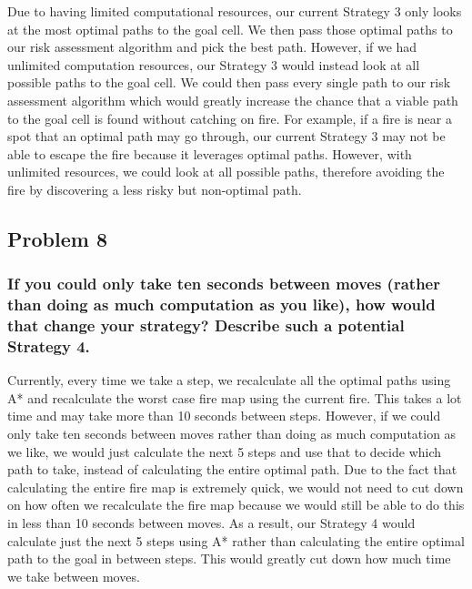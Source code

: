 \documentclass[11pt]{article}
\begin{document}
    Due to having limited computational resources, our current Strategy 3
only looks at the most optimal paths to the goal cell. We then pass
those optimal paths to our risk assessment algorithm and pick the best
path. However, if we had unlimited computation resources, our Strategy 3
would instead look at all possible paths to the goal cell. We could then
pass every single path to our risk assessment algorithm which would
greatly increase the chance that a viable path to the goal cell is found
without catching on fire. For example, if a fire is near a spot that an
optimal path may go through, our current Strategy 3 may not be able to
escape the fire because it leverages optimal paths. However, with
unlimited resources, we could look at all possible paths, therefore
avoiding the fire by discovering a less risky but non-optimal path.

    \hypertarget{problem-8}{%
\subsection{Problem 8}\label{problem-8}}

    \hypertarget{if-you-could-only-take-ten-seconds-between-moves-rather-than-doing-as-much-computation-as-you-like-how-would-that-change-your-strategy-describe-such-a-potential-strategy-4.}{%
\subsubsection{If you could only take ten seconds between moves (rather
than doing as much computation as you like), how would that change your
strategy? Describe such a potential Strategy
4.}\label{if-you-could-only-take-ten-seconds-between-moves-rather-than-doing-as-much-computation-as-you-like-how-would-that-change-your-strategy-describe-such-a-potential-strategy-4.}}

    Currently, every time we take a step, we recalculate all the optimal
paths using A* and recalculate the worst case fire map using the current
fire. This takes a lot time and may take more than 10 seconds between
steps. However, if we could only take ten seconds between moves rather
than doing as much computation as we like, we would just calculate the
next 5 steps and use that to decide which path to take, instead of
calculating the entire optimal path. Due to the fact that calculating
the entire fire map is extremely quick, we would not need to cut down on
how often we recalculate the fire map because we would still be able to
do this in less than 10 seconds between moves. As a result, our Strategy
4 would calculate just the next 5 steps using A* rather than calculating
the entire optimal path to the goal in between steps. This would greatly
cut down how much time we take between moves.


    
    
    
\end{document}
